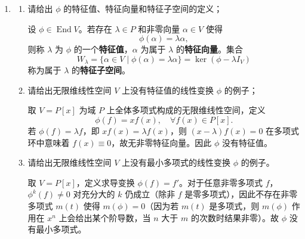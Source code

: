 \documentclass[lang=cn,12pt]{elegantbook}
\begin{document}
\begin{example}
\begin{enumerate}
\begin{solution}
            \textbf{(c)} 采用 (a) 中构造即满足 \(ker \phi + \operatorname{Im} \phi = Span(e_2) \neq V\)。
        \end{solution}
    
        \item[(3)] 
        \begin{enumerate}
            \item[(a)] 请给出 \(\phi\) 的特征值、特征向量和特征子空间的定义；
    
            \begin{solution}
                设 \(\phi \in \operatorname{End}V\)。若存在 \(\lambda \in P\) 和非零向量 \(\alpha \in V\) 使得
                \[
                \phi(\alpha) = \lambda \alpha,
                \]
                则称 \(\lambda\) 为 \(\phi\) 的一个\textbf{特征值}，\(\alpha\) 为属于 \(\lambda\) 的\textbf{特征向量}。集合
                \[
                W_\lambda = \{\alpha \in V \mid \phi(\alpha) = \lambda \alpha\} = \ker(\phi - \lambda I_V)
                \]
                称为属于 \(\lambda\) 的\textbf{特征子空间}。
            \end{solution}
    
            \item[(b)] 请给出无限维线性空间 \(V\) 上没有特征值的线性变换 \(\phi\) 的例子；
    
            \begin{solution}
                取 \(V = P[x]\) 为域 \(P\) 上全体多项式构成的无限维线性空间，定义
                \[
                \phi(f) = x f(x),\quad \forall f(x) \in P[x].
                \]
                若 \(\phi(f) = \lambda f\)，即 \(x f(x) = \lambda f(x)\)，则 \((x - \lambda) f(x) = 0\) 在多项式环中意味着 \(f(x) \equiv 0\)，故无非零特征向量。因此 \(\phi\) 没有特征值。
            \end{solution}
    
            \item[(c)] 请给出无限维线性空间 \(V\) 上没有最小多项式的线性变换 \(\phi\) 的例子。
    
            \begin{solution}
                取 \(V = P[x]\)，定义求导变换 \(\phi(f) = f'\)。对于任意非零多项式 \(f\)，\(\phi^k(f) \neq 0\) 对充分大的 \(k\) 仍成立（除非 \(f\) 是零多项式），因此不存在非零多项式 \(m(t)\) 使得 \(m(\phi)=0\)（因为若 \(m(t)\) 是多项式，则 \(m(\phi)\) 作用在 \(x^n\) 上会给出某个阶导数，当 \(n\) 大于 \(m\) 的次数时结果非零）。故 \(\phi\) 没有最小多项式。
            \end{solution}
        \end{enumerate}
    \end{enumerate}
\end{example}
\end{document}
